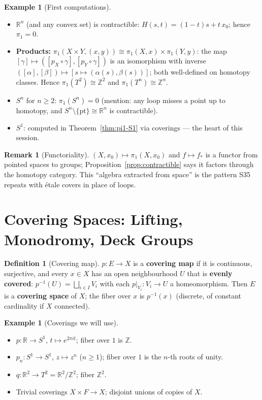 \documentclass[11pt,a4paper]{article}
\theoremstyle{definition}
\newtheorem{definition}[theorem]{Definition}
\newtheorem{example}[theorem]{Example}
\newtheorem{remark}[theorem]{Remark}
\newcommand{\Z}{\mathbb{Z}}
\newcommand{\R}{\mathbb{R}}
\begin{document}
	\begin{example}[First computations]\label{ex:pi1-first}
		\begin{itemize}
			\item $\R^n$ (and any convex set) is contractible: $H(s,t)=(1-t)s+ t\,x_0$; hence $\pi_1=0$.
			\item \textbf{Products:} $\pi_1(X\times Y,(x,y))\cong\pi_1(X,x)\times\pi_1(Y,y)$: the map
			$[\gamma]\mapsto([p_X\circ\gamma],[p_Y\circ\gamma])$ is an isomorphism with inverse
			$([\alpha],[\beta])\mapsto[s\mapsto(\alpha(s),\beta(s))]$; both well-defined on homotopy classes.
			Hence $\pi_1(T^2)\cong\Z^2$ and $\pi_1(T^n)\cong\Z^n$.
			\item $S^n$ for $n\ge2$: $\pi_1(S^n)=0$ (mention: any loop misses a point up to homotopy, and
			$S^n\setminus\{\text{pt}\}\cong\R^n$ is contractible).
			\item $S^1$: computed in Theorem~\ref{thm:pi1-S1} via coverings --- the heart of this session.
		\end{itemize}
	\end{example}
	
	\begin{remark}[Functoriality]
		$(X,x_0)\mapsto\pi_1(X,x_0)$ and $f\mapsto f_*$ is a functor from pointed spaces to groups;
		Proposition~\ref{prop:contractible} says it factors through the homotopy category. This
		``algebra extracted from space'' is the pattern S35 repeats with \'etale covers in place of loops.
	\end{remark}
	
	\section{Covering Spaces: Lifting, Monodromy, Deck Groups}
	
	\begin{definition}[Covering map]
		$p:E\to X$ is a \textbf{covering map} if it is continuous, surjective, and every $x\in X$ has an
		open neighbourhood $U$ that is \textbf{evenly covered}: $p^{-1}(U)=\bigsqcup_{i\in I}V_i$ with each
		$p|_{V_i}:V_i\to U$ a homeomorphism. Then $E$ is a \textbf{covering space} of $X$; the fiber over
		$x$ is $p^{-1}(x)$ (discrete, of constant cardinality if $X$ connected).
	\end{definition}
	
	\begin{example}[Coverings we will use]\label{ex:coverings}
		\begin{itemize}
			\item $p:\R\to S^1$, $t\mapsto e^{2\pi i t}$; fiber over $1$ is $\Z$.
			\item $p_n:S^1\to S^1$, $z\mapsto z^n$ ($n\ge1$); fiber over $1$ is the $n$-th roots of unity.
			\item $q:\R^2\to T^2=\R^2/\Z^2$; fiber $\Z^2$.
			\item Trivial coverings $X\times F\to X$; disjoint unions of copies of $X$.
		\end{itemize}
	\end{example}
	
\end{document}
